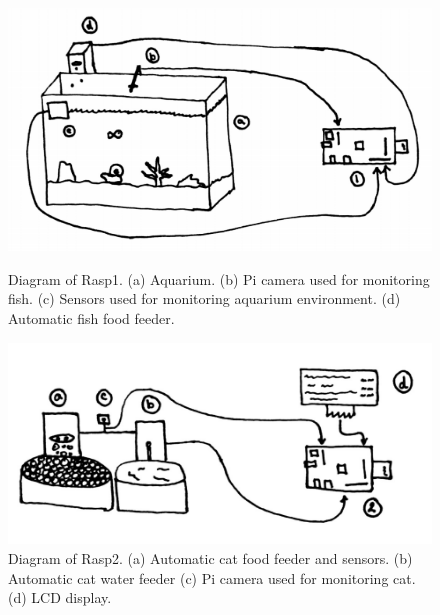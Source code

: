 \begin{figure}[H]
    \centering
    \begin{minipage}[b]{0.45\linewidth}
        \centering
        \captionsetup{justification=centering, margin = 0.5cm}
        \includegraphics[scale=0.3]{images/FishTank} 
        \caption{Diagram of Rasp1. (a) Aquarium. (b) Pi camera used for
        monitoring fish. (c) Sensors used for monitoring aquarium environment.
        (d) Automatic fish food feeder.}
        \label{fig:highFood}
    \end{minipage}
    \quad
    \begin{minipage}[b]{0.45\linewidth}
        \centering
        \captionsetup{justification=centering, margin = 0.5cm}
        \includegraphics[scale=0.4]{images/Cat} 
        \caption{Diagram of Rasp2. (a) Automatic cat food feeder and sensors.
        (b) Automatic cat water feeder (c) Pi camera used for monitoring cat.
        (d) LCD display.}
        \label{fig:highCat}
    \end{minipage}
\end{figure}


